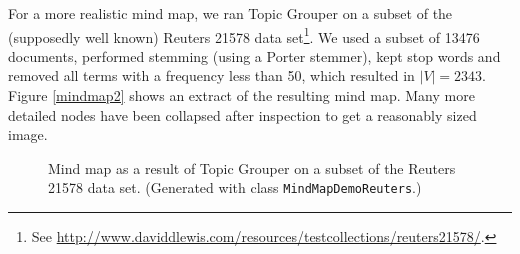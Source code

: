 \documentclass[10pt, a4paper, oneside]{article}
\begin{document}
For a more realistic mind map, we ran Topic Grouper on a subset of the (supposedly well known) Reuters 21578 data set\footnote{See
\href{http://www.daviddlewis.com/resources/testcollections/reuters21578/}{http://www.daviddlewis.com/resources/testcollections/reuters21578/}.}.
We used a subset of 13476 documents, performed stemming (using a Porter stemmer), kept stop words and removed all terms with a frequency less than 50, which resulted in $|V| = 2343$. Figure \ref{mindmap2} shows an extract of the resulting mind map. Many more detailed nodes have been collapsed after inspection to get a reasonably sized image.

\begin{figure}
\caption{Mind map as a result of Topic Grouper on a subset of the Reuters 21578 data set. (Generated with class \texttt{MindMapDemoReuters}.)}
\label{mindmap1}
\end{figure}
\end{document}
